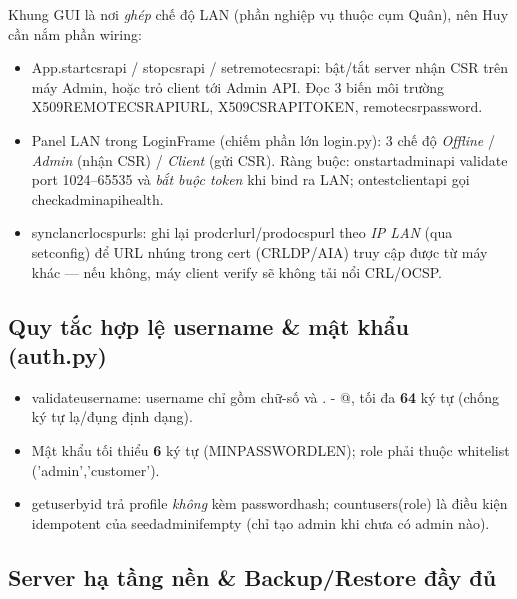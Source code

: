 \documentclass[12pt,a4paper]{article}
\newcommand{\code}[1]{{\ttfamily\small\def\_{\textunderscore\discretionary{}{}{}}#1}}
\begin{document}
Khung GUI là nơi \emph{ghép} chế độ LAN (phần nghiệp vụ thuộc cụm Quân), nên Huy
cần nắm phần wiring:
\begin{itemize}
  \item \code{App.start\_csr\_api} / \code{stop\_csr\_api} / \code{set\_remote\_csr\_api}:
        bật/tắt server nhận CSR trên máy Admin, hoặc trỏ client tới Admin API. Đọc
        3 biến môi trường \code{X509\_REMOTE\_CSR\_API\_URL}, \code{X509\_CSR\_API\_TOKEN},
        \code{remote\_csr\_password}.
  \item Panel LAN trong \code{LoginFrame} (chiếm phần lớn \code{login.py}): 3 chế độ
        \emph{Offline} / \emph{Admin} (nhận CSR) / \emph{Client} (gửi CSR). Ràng buộc:
        \code{on\_start\_admin\_api} validate port 1024--65535 và \emph{bắt buộc token}
        khi bind ra LAN; \code{on\_test\_client\_api} gọi \code{check\_admin\_api\_health}.
  \item \code{\_sync\_lan\_crl\_ocsp\_urls}: ghi lại \code{prod\_crl\_url}/\code{prod\_ocsp\_url}
        theo \emph{IP LAN} (qua \code{set\_config}) để URL nhúng trong cert (CRLDP/AIA)
        truy cập được từ máy khác --- nếu không, máy client verify sẽ không tải nổi CRL/OCSP.
\end{itemize}

\subsection{Quy tắc hợp lệ username \& mật khẩu (\code{auth.py})}

\begin{itemize}
  \item \code{\_validate\_username}: username chỉ gồm chữ-số và \code{. \_ - @}, tối đa
        \textbf{64} ký tự (chống ký tự lạ/đụng định dạng).
  \item Mật khẩu tối thiểu \textbf{6} ký tự (\code{MIN\_PASSWORD\_LEN}); \code{role} phải
        thuộc whitelist \code{('admin','customer')}.
  \item \code{get\_user\_by\_id} trả profile \emph{không} kèm \code{password\_hash};
        \code{count\_users(role)} là điều kiện idempotent của \code{seed\_admin\_if\_empty}
        (chỉ tạo admin khi chưa có admin nào).
\end{itemize}

\subsection{Server hạ tầng nền \& Backup/Restore đầy đủ}
\end{document}

